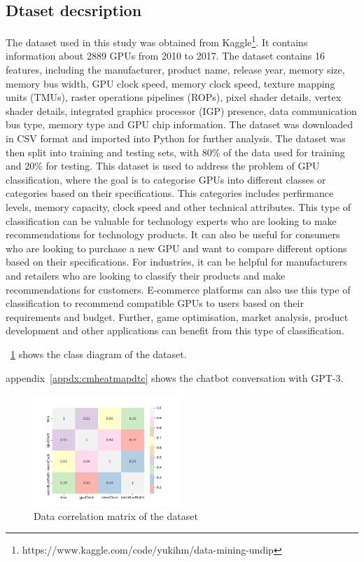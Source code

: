 \documentclass[conference,onecolumn]{IEEEtran}
\begin{document}
\subsection{Dtaset decsription}
    The dataset used in this study was obtained from Kaggle\footnote{https://www.kaggle.com/code/yukihm/data-mining-undip}. It contains information about 2889 GPUs from 2010 to 2017. The dataset contains 16 features, including the manufacturer, product name, release year, memory size, memory bus width, GPU clock speed, memory clock speed, texture mapping units (TMUs), raster operations pipelines (ROPs), pixel shader details, vertex shader details, integrated graphics processor (IGP) presence, data communication bus type, memory type and GPU chip information. The dataset was downloaded in CSV format and imported into Python for further analysis. The dataset was then split into training and testing sets, with 80\% of the data used for training and 20\% for testing. 
    This dataset is used to address the problem of GPU classification, where the goal is to categorise GPUs into different classes or categories based on their specifications. This categories includes perfirmance levels, memory capacity, clock speed and other technical attributes. This type of classification can be valuable for technology experts who are looking to make recommendations for technology products. It can also be useful for consumers who are looking to purchase a new GPU and want to compare different options based on their specifications. For industries, it can be helpful for manufacturers and retailers who are looking to classify their products and make recommendations for customers. E-commerce platforms can also use this type of classification to recommend compatible GPUs to users based on their requirements and budget. Further, game optimisation, market analysis, product development and other applications can benefit from this type of classification.

    \figurename~\ref{fig:datacorrelationmatrix} shows the class diagram of the dataset.
    
    appendix~\ref{appdx:cmheatmapdtc} shows the chatbot conversation with GPT-3.
    \begin{figure}[H]
		\centering
		\includegraphics[width=0.5\textwidth]{Plots/DataCorelation.png}
		\caption{Data correlation matrix of the dataset}
		\label{fig:datacorrelationmatrix}
	\end{figure}
\end{document}
